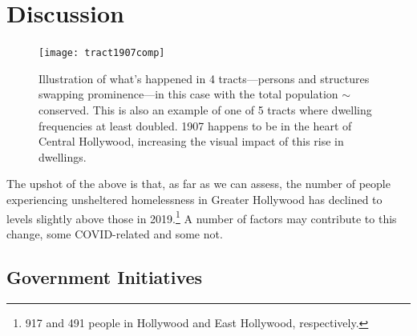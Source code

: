 \documentclass[11pt,twocolumn]{article}
\def\resp{respectively}
\begin{document}
%
%
%

\section{Discussion}
\label{sec:discussion}

\begin{figure}[t]
	\centering
	\texttt{[image: tract1907comp]}
	\caption{Illustration of what's happened in 4 tracts---persons and structures
			swapping prominence---in this case with the total population
			$\sim$conserved. This is also an example of one of 5 tracts where
			dwelling frequencies at least doubled. 1907 happens to be in the 
			heart of Central Hollywood, increasing the visual impact of this
			rise in dwellings.}
	\label{fig:1907}
\end{figure}

The upshot of the above is that, as far as we can assess, the number of people experiencing unsheltered
homelessness in Greater Hollywood has declined to levels slightly above those in 2019.\footnote{917 and 491 
people in Hollywood and East Hollywood, \resp.} A number of factors may contribute to this change, some 
COVID-related and some not.

\subsection{Government Initiatives}
\end{document}
